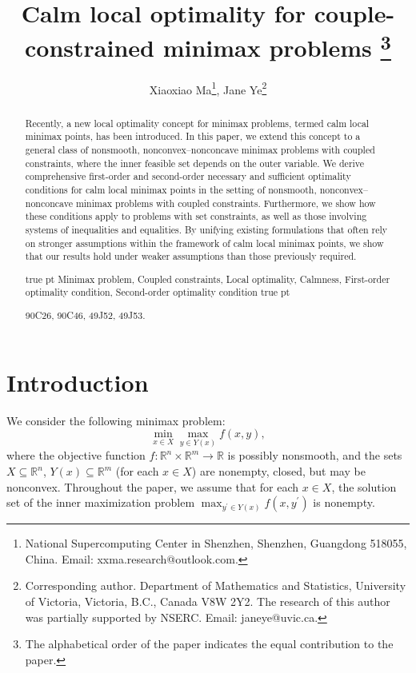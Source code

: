 \documentclass[11pt]{article}
\numberwithin{equation}{section}
\begin{document}
	
	\title{Calm local optimality for couple-constrained minimax problems 
		\thanks{The alphabetical order of the paper indicates the equal contribution to the paper.}
		}
	\author{Xiaoxiao Ma\thanks{National Supercomputing Center in Shenzhen, Shenzhen, Guangdong 518055, China. Email: xxma.research@outlook.com.}, Jane Ye\thanks{Corresponding author. Department of Mathematics and Statistics, University of Victoria, Victoria, B.C., Canada V8W 2Y2.  The research of this author was partially supported by NSERC. Email: janeye@uvic.ca.}  }
	\date{}
	\maketitle
	\begin{abstract}
	Recently, a new local optimality concept for minimax problems, termed calm local minimax points, has been introduced.
	In this paper, we extend this concept to a general class of nonsmooth, nonconvex–nonconcave minimax problems with coupled constraints, where the inner feasible set depends on the outer variable. We derive comprehensive first-order and second-order necessary and sufficient optimality conditions for calm local minimax points in the setting of nonsmooth, nonconvex–nonconcave minimax problems with coupled constraints. Furthermore, we show how these conditions apply to problems with set constraints, as well as those involving systems of inequalities and equalities. By unifying existing formulations that often rely on stronger assumptions within the framework of calm local minimax points, we show that our results hold under weaker assumptions than those previously required.
		
		
		 true pt
		\quad Minimax problem, Coupled constraints, Local optimality, Calmness, First-order optimality condition, Second-order optimality condition
		 true pt
		
		 {90C26, 90C46, 49J52, 49J53}.
		
	\end{abstract}
	\newpage

\section{Introduction}
We consider the following minimax problem:
\begin{equation}\label{minimax}\tag{Min-Max}
	\min_{x\in X} \max_{y\in Y(x)} f(x,y),
\end{equation}
where the objective function $f:\mathbb{R}^n\times\mathbb{R}^m\rightarrow\mathbb{R}$ is possibly nonsmooth, and the sets $X \subseteq\mathbb{R}^n$, $Y(x)\subseteq\mathbb{R}^m$ (for each $x \in X$) are nonempty, closed, but may be nonconvex. Throughout the paper, we assume that for each $x \in X$, the solution set of the inner maximization problem $\max _{y^{\prime} \in Y(x)} f(x, y^{\prime})$ is nonempty.
\end{document}
